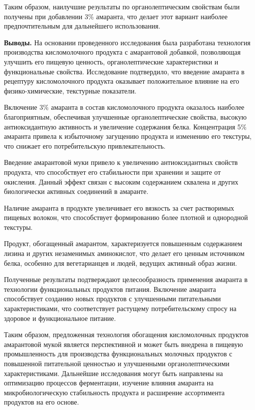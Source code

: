 {Таким образом, наилучшие результаты по органолептическим свойствам были
получены при добавлении 3\% амаранта, что делает этот вариант наиболее
предпочтительным для дальнейшего использования.

{\bfseries Выводы.} На основании проведенного исследования была разработана
технология производства кисломолочного продукта с амарантовой добавкой,
позволяющая улучшить его пищевую ценность, органолептические
характеристики и функциональные свойства. Исследование подтвердило, что
введение амаранта в рецептуру кисломолочного продукта оказывает
положительное влияние на его физико-химические, текстурные показатели.

Включение 3\% амаранта в состав кисломолочного продукта оказалось
наиболее благоприятным, обеспечивая улучшенные органолептические
свойства, высокую антиоксидантную активность и увеличение содержания
белка. Концентрация 5\% амаранта привела к избыточному загущению
продукта и изменению его текстуры, что снижает его потребительскую
привлекательность.

Введение амарантовой муки привело к увеличению антиоксидантных свойств
продукта, что способствует его стабильности при хранении и защите от
окисления. Данный эффект связан с высоким содержанием сквалена и других
биологически активных соединений в амаранте.

Наличие амаранта в продукте увеличивает его вязкость за счет растворимых
пищевых волокон, что способствует формированию более плотной и
однородной текстуры.

Продукт, обогащенный амарантом, характеризуется повышенным содержанием
лизина и других незаменимых аминокислот, что делает его ценным
источником белка, особенно для вегетарианцев и людей, ведущих активный
образ жизни.

Полученные результаты подтверждают целесообразность применения амаранта
в технологии функциональных продуктов питания. Включение амаранта
способствует созданию новых продуктов с улучшенными питательными
характеристиками, что соответствует растущему потребительскому спросу на
здоровое и функциональное питание.

Таким образом, предложенная технология обогащения кисломолочных
продуктов амарантовой мукой является перспективной и может быть внедрена
в пищевую промышленность для производства функциональных молочных
продуктов с повышенной питательной ценностью и улучшенными
органолептическими характеристиками. Дальнейшие исследования могут быть
направлены на оптимизацию процессов ферментации, изучение влияния
амаранта на микробиологическую стабильность продукта и расширение
ассортимента продуктов на его основе.

}
